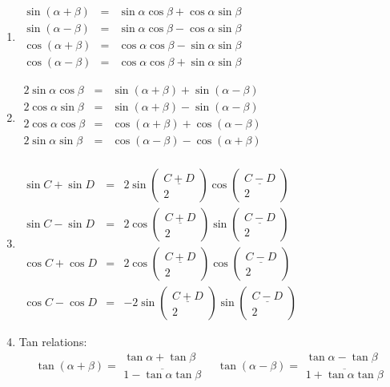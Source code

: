 \documentclass[a4paper]{article}
\newcommand{\cplusd}{%
(\begin{array}{c}
\underline{C+D} \\
2
\end{array})
}
\newcommand{\cminusd}{%
(\begin{array}{c}
\underline{C-D} \\
2
\end{array})
}
\begin{document}
\begin{enumerate}
\item
$\begin{array}{rcl}
\sin(\alpha + \beta) &=& \sin\alpha \cos\beta + \cos\alpha \sin\beta \\
\sin(\alpha - \beta) &=& \sin\alpha \cos\beta - \cos\alpha \sin\beta \\
\cos(\alpha + \beta) &=& \cos\alpha \cos\beta - \sin\alpha \sin\beta \\
\cos(\alpha - \beta) &=& \cos\alpha \cos\beta + \sin\alpha \sin\beta
\end{array}$

\item
$\begin{array}{rcl}
2\sin\alpha \cos\beta &=& \sin (\alpha+\beta) + \sin (\alpha-\beta) \\
2\cos\alpha \sin\beta &=& \sin (\alpha+\beta) - \sin (\alpha-\beta) \\
2\cos\alpha \cos\beta &=& \cos (\alpha+\beta) + \cos (\alpha-\beta) \\
2\sin\alpha \sin\beta &=& \cos (\alpha-\beta) - \cos (\alpha+\beta) \\
\end{array}$

\item
$\begin{array}{rcl}
\sin C + \sin D &=& 2\sin\cplusd \cos\cminusd \\
\sin C - \sin D &=& 2\cos\cplusd \sin\cminusd \\
\cos C + \cos D &=& 2\cos\cplusd \cos\cminusd \\
\cos C - \cos D &=& -2\sin\cplusd \sin\cminusd
\end{array}$

\item
Tan relations:
\begin{equation}\label{eq:tanaplusb}
\tan(\alpha + \beta) =
\begin{array}{c}
\tan\alpha + \tan\beta \\
\overline{1 - \tan\alpha \tan\beta}
\end{array}
\quad
\tan(\alpha - \beta) =
\begin{array}{c}
\tan\alpha - \tan\beta \\
\overline{1 + \tan\alpha \tan\beta}
\end{array}
\end{equation}


\end{enumerate}
\end{document}
